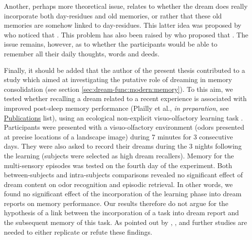 Another, perhaps more theoretical issue, relates to whether the dream does really incorporate both day-residues and old memories, or rather that these old memories are somehow linked to day-residues. This latter idea was proposed by \citet{freud_interpretation_1900} who noticed that  \citep{marquardt_empirical_1996}. This problem has also been raised by \citet{grenier_temporal_2005} who proposed that . The issue remains, however, as to whether the participants would be able to remember all their daily thoughts, words and deeds.

Finally, it should be added that the author of the present thesis contributed to a study which aimed at investigating the putative role of dreaming in memory consolidation (see section \ref{sec:dream-func:modern:memory}). To this aim, we tested whether recalling a dream related to a recent experience is associated with improved post-sleep memory performance (Plailly et al., \emph{in preparation}, see \hyperref[sec:publications]{Publications} list), using an ecological non-explicit visuo-olfactory learning task \citep{saive_novel_2013}. Participants were presented with a visuo-olfactory environment (odors presented at precise locations of a landscape image) during 7 minutes for 3 consecutive days. They were also asked to record their dreams during the 3 nights following the learning (subjects were selected as high dream recallers). Memory for the multi-sensory episodes was tested on the fourth day of the experiment. Both between-subjects and intra-subjects comparisons revealed no significant effect of dream content on odor recognition and episodic retrieval. In other words, we found no significant effect of the incorporation of the learning phase into dream reports on memory performance. Our results therefore do not argue for the hypothesis of a link between the incorporation of a task into dream report and the subsequent memory of this task. As pointed out by \citet{schredl_is_2017}, , and further studies are needed to either replicate or refute these findings.

